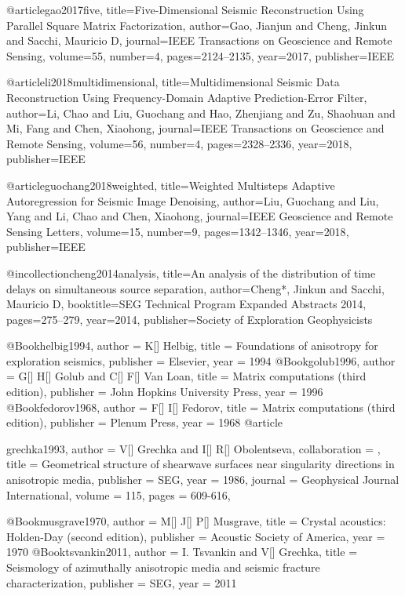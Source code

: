 @article{gao2017five,
  title={Five-Dimensional Seismic Reconstruction Using Parallel Square Matrix Factorization},
  author={Gao, Jianjun and Cheng, Jinkun and Sacchi, Mauricio D},
  journal={IEEE Transactions on Geoscience and Remote Sensing},
  volume={55},
  number={4},
  pages={2124--2135},
  year={2017},
  publisher={IEEE}
}

@article{li2018multidimensional,
  title={Multidimensional Seismic Data Reconstruction Using Frequency-Domain Adaptive Prediction-Error Filter},
  author={Li, Chao and Liu, Guochang and Hao, Zhenjiang and Zu, Shaohuan and Mi, Fang and Chen, Xiaohong},
  journal={IEEE Transactions on Geoscience and Remote Sensing},
  volume={56},
  number={4},
  pages={2328--2336},
  year={2018},
  publisher={IEEE}
}

@article{guochang2018weighted,
  title={Weighted Multisteps Adaptive Autoregression for Seismic Image Denoising},
  author={Liu, Guochang and Liu, Yang and Li, Chao and Chen, Xiaohong},
  journal={IEEE Geoscience and Remote Sensing Letters},
  volume={15},
  number={9},
  pages={1342--1346},
  year={2018},
  publisher={IEEE}
}


@incollection{cheng2014analysis,
  title={An analysis of the distribution of time delays on simultaneous source separation},
  author={Cheng*, Jinkun and Sacchi, Mauricio D},
  booktitle={SEG Technical Program Expanded Abstracts 2014},
  pages={275--279},
  year={2014},
  publisher={Society of Exploration Geophysicists}
}

@Book{helbig1994,
  author =	 {K[] Helbig},
  title =	 {Foundations of anisotropy for exploration seismics},
  publisher =	 {Elsevier},
  year =	 1994
}
@Book{golub1996,
  author =	 {G[] H[] Golub and C[] F[] Van Loan},
  title =	 {Matrix computations (third edition)},
  publisher =	 {John Hopkins University Press},
  year =	 1996
}
@Book{fedorov1968,
  author =	 {F[] I[] Fedorov},
  title =	 {Matrix computations (third edition)},
  publisher =	 {Plenum Press},
  year =	 1968
}
@article{grechka1993,
author = {V[] Grechka and I[] R[] Obolentseva},
collaboration = {},
title = {Geometrical structure of shearwave
surfaces near singularity directions in anisotropic media},
publisher = {SEG},
year = {1986},
journal = {Geophysical Journal International},
volume = {115},
pages = {609-616},

}

@Book{musgrave1970,
  author =	 {M[] J[] P[] Musgrave},
  title =	 {Crystal acoustics: Holden-Day (second edition)},
  publisher =	 {Acoustic Society of America},
  year =	 1970
}
@Book{tsvankin2011,
  author =	 {I. Tsvankin and V[] Grechka},
  title =	 {Seismology of azimuthally anisotropic media and seismic fracture characterization},
  publisher =	 {SEG},
  year =	 2011
}

